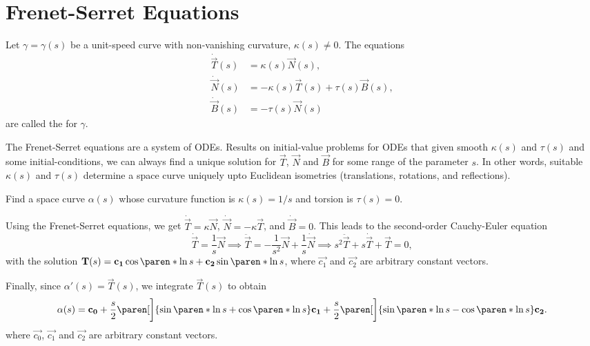 \documentclass[11pt]{penrose}
\newcommand{\vT}{\vec{T}}
\newcommand{\vN}{\vec{N}}
\newcommand{\vB}{\vec{B}}
\begin{document}
\section{Frenet-Serret Equations}

\begin{ndfn}
    Let $\gamma = \gamma(s)$ be a unit-speed curve with non-vanishing curvature, $\kappa(s) \neq 0$. The equations
    \begin{align}
        \dot{\vT}(s) &= \kappa(s) \vN(s),\\
        \dot{\vN}(s) &= -\kappa(s) \vT(s) + \tau(s) \vB(s),\\
        \dot{\vB}(s) &= -\tau(s) \vN(s)
    \end{align}
    are called the  for $\gamma$.
\end{ndfn}

The Frenet-Serret equations are a system of ODEs. Results on initial-value problems for ODEs that given smooth $\kappa(s)$ and $\tau(s)$ and some initial-conditions, we can always find a unique solution for $\vT$, $\vN$ and $\vB$ for some range of the parameter $s$. In other words, suitable $\kappa(s)$ and $\tau(s)$ determine a space curve uniquely upto Euclidean isometries (translations, rotations, and reflections).

\begin{negg}
    Find a space curve $\alpha(s)$ whose curvature function is $\kappa(s) = 1/s$ and torsion is $\tau(s) = 0$.

    Using the Frenet-Serret equations, we get $\dot{\vT} = \kappa \vN$, $\dot{\vN} = - \kappa \vT$, and $\dot{\vB} = 0$. This leads to the second-order Cauchy-Euler equation
    \begin{equation}
        \dot{\vT} = \frac{1}{s} \vN
        \implies
        \ddot{\vT} = -\frac{1}{s^2} \vN + \frac{1}{s} \dot{\vN}
        \implies
        s^2 \ddot{\vT} + s \dot{\vT} + \vT = 0,
    \end{equation}
    with the solution $\vT(s) = \vec{c_1} \cos\paren*{\ln s} + \vec{c_2} \sin\paren*{\ln s}$, where $\vec{c_1}$ and $\vec{c_2}$ are arbitrary constant vectors.

    Finally, since $\alpha'(s) = \vT(s)$, we integrate $\vT(s)$ to obtain
    \begin{equation}
        \alpha(s) = \vec{c_0}
        + \frac{s}{2} \paren[\bigg]{\sin\paren*{\ln s} + \cos\paren*{\ln s}} \vec{c_1}
        + \frac{s}{2} \paren[\bigg]{\sin\paren*{\ln s} - \cos\paren*{\ln s}} \vec{c_2}.
    \end{equation}
    where $\vec{c_0}$, $\vec{c_1}$ and $\vec{c_2}$ are arbitrary constant vectors.
\end{negg}
\end{document}
